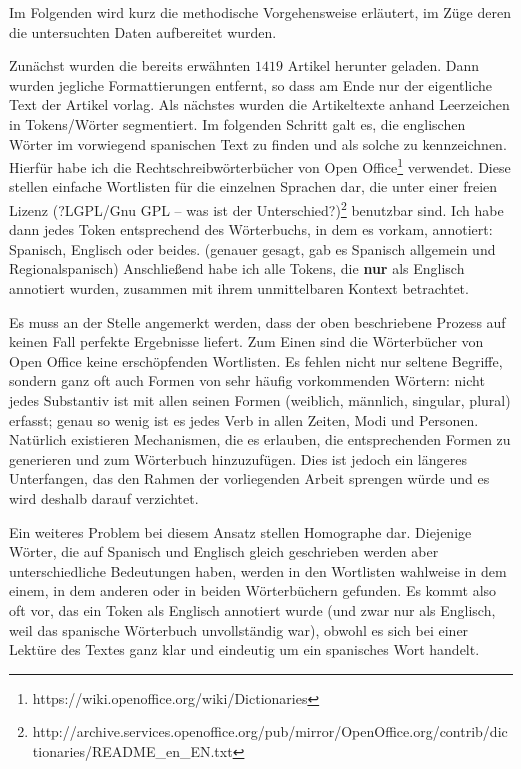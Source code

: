 Im Folgenden wird kurz die methodische Vorgehensweise erläutert, im Züge deren die untersuchten Daten aufbereitet wurden.

Zunächst wurden die bereits erwähnten $1419$ Artikel herunter geladen.
Dann wurden jegliche Formattierungen entfernt, so dass am Ende nur der eigentliche Text der Artikel vorlag.
Als nächstes wurden die Artikeltexte anhand Leerzeichen in Tokens/Wörter segmentiert.
Im folgenden Schritt galt es, die englischen Wörter im vorwiegend spanischen Text zu finden und als solche zu kennzeichnen.
Hierfür habe ich die Rechtschreibwörterbücher von Open Office\footnote{https://wiki.openoffice.org/wiki/Dictionaries} verwendet.
Diese stellen einfache Wortlisten für die einzelnen Sprachen dar, die unter einer freien Lizenz (?LGPL/Gnu GPL -- was ist der Unterschied?)\footnote{http://archive.services.openoffice.org/pub/mirror/OpenOffice.org/contrib/dictionaries/README\_en\_EN.txt} benutzbar sind.
Ich habe dann jedes Token entsprechend des Wörterbuchs, in dem es vorkam, annotiert: Spanisch, Englisch oder beides. (genauer gesagt, gab es Spanisch allgemein und Regionalspanisch)
Anschließend habe ich alle Tokens, die \textbf{nur} als Englisch annotiert wurden, zusammen mit ihrem unmittelbaren Kontext betrachtet.

Es muss an der Stelle angemerkt werden, dass der oben beschriebene Prozess auf keinen Fall perfekte Ergebnisse liefert.
Zum Einen sind die Wörterbücher von Open Office keine erschöpfenden Wortlisten.
Es fehlen nicht nur seltene Begriffe, sondern ganz oft auch Formen von sehr häufig vorkommenden Wörtern:
nicht jedes Substantiv ist mit allen seinen Formen (weiblich, männlich, singular, plural) erfasst;
genau so wenig ist es jedes Verb in allen Zeiten, Modi und Personen.
Natürlich existieren Mechanismen, die es erlauben, die entsprechenden Formen zu generieren und zum Wörterbuch hinzuzufügen.
Dies ist jedoch ein längeres Unterfangen, das den Rahmen der vorliegenden Arbeit sprengen würde und es wird deshalb darauf verzichtet.

Ein weiteres Problem bei diesem Ansatz stellen Homographe dar.
Diejenige Wörter, die auf Spanisch und Englisch gleich geschrieben werden aber unterschiedliche Bedeutungen haben, werden in den Wortlisten wahlweise in dem einem, in dem anderen oder in beiden Wörterbüchern gefunden.
Es kommt also oft vor, das ein Token als Englisch annotiert wurde (und zwar nur als Englisch, weil das spanische Wörterbuch unvollständig war), obwohl es sich bei einer Lektüre des Textes ganz klar und eindeutig um ein spanisches Wort handelt.

